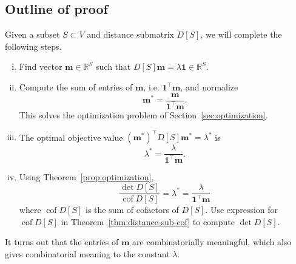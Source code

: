 \documentclass{amsart}
\theoremstyle{definition}
\newcommand{\RR}{\mathbb{R}}
\newcommand{\bone}{\mathbf{1}}
\newcommand{\boldm}{\mathbf{m}}
\newcommand{\tr}{\intercal}
\DeclareMathOperator{\cof}{cof}
\begin{document}
\subsection{Outline of proof} 
Given a  subset $S \subset V$ and distance submatrix $D[S]$, we will complete the following steps.
\begin{enumerate}[(i)]
\item 
Find vector $\boldm \in \RR^S$ such that $D[S]\boldm = \lambda \mathbf{1} \in \RR^S$.

\item 
Compute the sum of entries of $\boldm$, i.e. $\mathbf{1}^\tr \boldm$, and normalize
\[
	\boldm^* = \frac{\boldm}{\bone^\tr \boldm}.
\]
This solves the optimization problem of Section~\ref{sec:optimization}.

\item 
The optimal objective value
$(\boldm^*)^\tr D[S] \boldm^* = \lambda^* $
is
\[
	\lambda^* = \frac{\lambda}{\bone^\tr \boldm}.
\]

\item 
Using Theorem~\ref{prop:optimization}, 
\[
\frac{\det D[S]}{\cof D[S]} 
= \lambda^*
= \frac{\lambda}{\mathbf{1}^\tr \boldm } 
\]
where $\cof D[S]$ is the sum of cofactors of $D[S]$.
Use expression for $\cof D[S]$ in Theorem~\ref{thm:distance-sub-cof} to compute $\det D[S]$.
\end{enumerate}
It turns out that the entries of $\boldm$ are combinatorially meaningful,
which also gives combinatorial meaning to
the constant $\lambda$.
\end{document}
